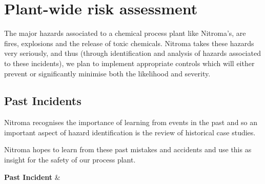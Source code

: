 \section{Plant-wide risk assessment}

The major hazards associated to a chemical process plant like Nitroma’s, are fires, explosions and the release of toxic chemicals. Nitroma takes these hazards very seriously, and thus (through identification and analysis of hazards associated to these incidents), we plan to implement appropriate controls which will either prevent or significantly minimise both the likelihood and severity. 

\subsection{Past Incidents}

Nitroma recognises the importance of learning from events in the past and so an important aspect of hazard identification is the review of historical case studies. 


Nitroma hopes to learn from these past mistakes and accidents and use this as insight for the safety of our process plant. 

\begin{landscape}
\begin{small}
\begin{longtable}

\toprule

\textbf{Past Incident}
                     & \textbf{}



\end{longtable}
\end{small}
\end{landscape}


